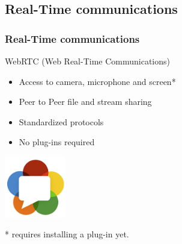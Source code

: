 \documentclass[compress]{beamer}
\begin{document}
	\subsection{Real-Time communications}\label{rtc}

		\begin{frame}[c]
		\frametitle{Real-Time communications}

		WebRTC (Web Real-Time Communications)

		\begin{itemize}
		\item Access to camera, microphone and screen*
		\item Peer to Peer file and stream sharing
		\item Standardized protocols
		\item No plug-ins required
		\end{itemize}

		\begin{flushright}

			\vspace*{-5\baselineskip}
			\includegraphics[width=0.2\textwidth]{figures/webrtc.png}
		\end{flushright}
		
			\tiny{* requires installing a plug-in yet.}

		\end{frame}
\end{document}
